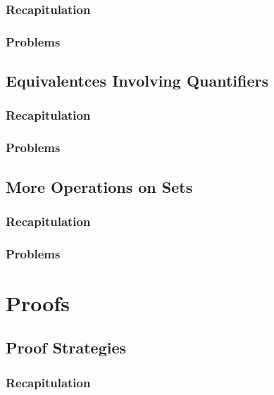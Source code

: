 \documentclass{report}
\begin{document}
        \subsection{Recapitulation}
        
        \subsection{Problems}
        
    \section{Equivalentces Involving Quantifiers}
        \subsection{Recapitulation}
        
        \subsection{Problems}
        
    \section{More Operations on Sets}
        \subsection{Recapitulation}
        
        \subsection{Problems}
        

\chapter{Proofs}
    \section{Proof Strategies}
        \subsection{Recapitulation}
\end{document}
